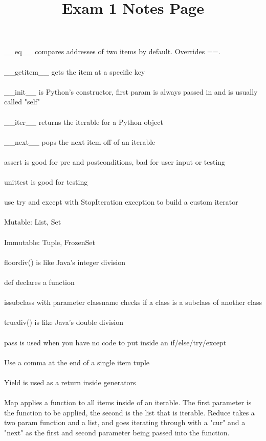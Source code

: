 \documentclass{article}
\title{Exam 1 Notes Page}
\author{}
\date{}
\begin{document}
\begin{multicols}{3}

\_\_eq\_\_ compares addresses of two items by default. Overrides ==.\\\\
\_\_getitem\_\_ gets the item at a specific key\\\\
\_\_init\_\_ is Python's constructor, first param is always passed in and is usually called "self"\\\\
\_\_iter\_\_ returns the iterable for a Python object\\\\
\_\_next\_\_ pops the next item off of an iterable\\\\
assert is good for pre and postconditions, bad for user input or testing\\\\
unittest is good for testing\\\\
use try and except with StopIteration exception to build a custom iterator\\\\
Mutable: List, Set\\\\
Immutable: Tuple, FrozenSet\\\\
floordiv() is like Java's integer division\\\\
def declares a function\\\\
issubclass with parameter classname checks if a class is a subclass of another class\\\\
truediv() is like Java's double division\\\\
pass is used when you have no code to put inside an if/else/try/except\\\\
Use a comma at the end of a single item tuple\\\\
Yield is used as a return inside generators\\\\
Map applies a function to all items inside of an iterable. The first parameter is the function to be applied, the second is the list that is iterable.
Reduce takes a two param function and a list, and goes iterating through with a "cur" and a "next" as the first and second parameter being passed into the function.

\end{multicols}
\end{document}
